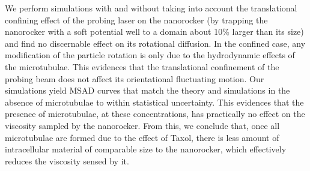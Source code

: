 \documentclass[ twoside,openright,titlepage,numbers=noenddot,%
headinclude,footinclude,cleardoublepage=empty,abstract=on,
BCOR=5mm,paper=b5,fontsize=11pt, dvipsnames
]{scrreprt}
\begin{document}
We perform simulations with and without taking into account the translational confining effect of the probing laser on the nanorocker (by trapping the nanorocker with a soft potential well to a domain about 10\% larger than its size) and find no discernable effect on its rotational diffusion. In the confined case, any modification of the particle rotation is only due to the hydrodynamic effects of the microtubulae. This evidences that the translational confinement of the probing beam does not affect its orientational fluctuating motion.
Our simulations yield MSAD curves that match the theory and simulations in the absence of microtubulae to within statistical uncertainty. This evidences that the presence of microtubulae, at these concentrations, has practically no effect on the viscosity sampled by the nanorocker. From this, we conclude that, once all microtubulae are formed due to the effect of Taxol, there is less amount of intracellular material of comparable size to the nanorocker, which effectively reduces the viscosity sensed by it.

%
\end{document}
